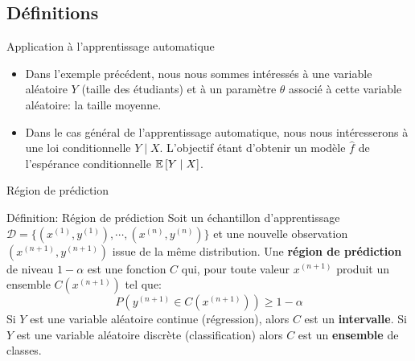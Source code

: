 \subsection[Définitions]{Définitions}

\begin{frame}{Application à l'apprentissage automatique}
	\begin{itemize}
		\item Dans l'exemple précédent, nous nous sommes intéressés à une variable aléatoire $Y$ (taille des étudiants) et à un paramètre $\theta$ associé à cette variable aléatoire: la taille moyenne.
		\pause
		\item Dans le cas général de l'apprentissage automatique, nous nous intéresserons à une loi conditionnelle $Y \mid X$. L'objectif étant d'obtenir un modèle $\hat{f}$ de l'espérance conditionnelle $\operatorname{\mathbb{E}}\left[Y \mid X\right]$.
	\end{itemize}
\end{frame}

\begin{frame}{Région de prédiction}
	\begin{block}{Définition: Région de prédiction}
		Soit un échantillon d'apprentissage $\mathcal{D} = \{\left(x^{(1)}, y^{(1)}\right), \cdots, \left(x^{(n)}, y^{(n)}\right)\}$ et une nouvelle observation $\left(x^{(n+1)}, y^{(n+1)}\right)$ issue de la même distribution. Une \textbf{région de prédiction} de niveau $1 - \alpha$ est une fonction $C$ qui, pour toute valeur $x^{(n+1)}$ produit un ensemble $C(x^{(n+1)})$ tel que:
		\begin{equation}
			P\left(y^{(n+1)} \in C\left(x^{(n+1)}\right)\right) \ge 1 - \alpha
			\nonumber
		\end{equation}
		Si $Y$ est une variable aléatoire continue (régression), alors $C$ est un \textbf{intervalle}. Si $Y$ est une variable aléatoire discrète (classification) alors $C$ est un \textbf{ensemble} de classes. 
	\end{block}
\end{frame}

